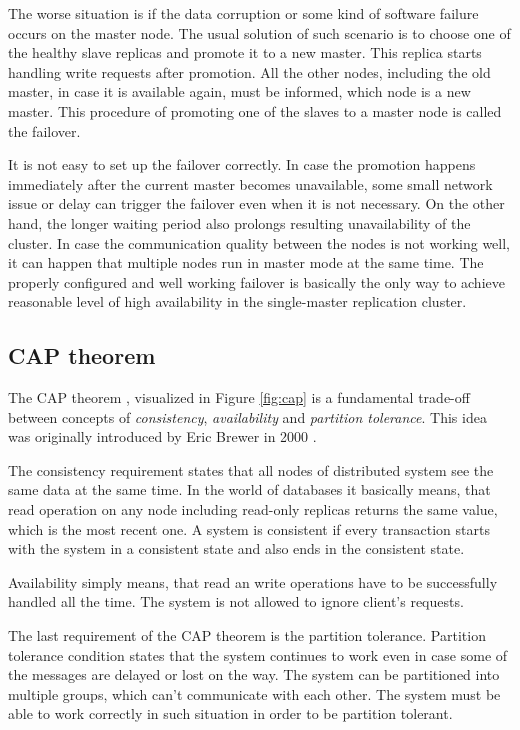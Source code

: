 \documentclass[
  digital, %
  twoside, %
  table,   %
  lof,     %
  lot,     %
]{fithesis3}
\begin{document}
The worse situation is if the data corruption or some kind of software failure occurs on the master node. The usual solution of such scenario is to choose one of the healthy slave replicas and promote it to a new master. This replica starts handling write requests after promotion. All the other nodes, including the old master, in case it is available again, must be informed, which node is a new master. This procedure of promoting one of the slaves to a master node is called the failover.

It is not easy to set up the failover correctly. In case the promotion happens immediately after the current master becomes unavailable, some small network issue or delay can trigger the failover even when it is not necessary. On the other hand, the longer waiting period also prolongs resulting unavailability of the cluster. In case the communication quality between the nodes is not working well, it can happen that multiple nodes run in master mode at the same time. The properly configured and well working failover is basically the only way to achieve reasonable level of high availability in the single-master replication cluster.

\subsection{CAP theorem}
The CAP theorem \cite{cap}, visualized in Figure \ref{fig:cap} is a fundamental trade-off between concepts of \textit{consistency}, \textit{availability} and \textit{partition tolerance}. This idea was originally introduced by Eric Brewer in 2000 \cite{brewer_cap}.

The consistency requirement states that all nodes of distributed system see the same data at the same time. In the world of databases it basically means, that read operation on any node including read-only replicas returns the same value, which is the most recent one. A system is consistent if every transaction starts with the system in a consistent state and also ends in the consistent state.

Availability simply means, that read an write operations have to be successfully handled all the time. The system is not allowed to ignore client's requests.

The last requirement of the CAP theorem is the partition tolerance. Partition tolerance condition states that the system continues to work even in case some of the messages are delayed or lost on the way. The system can be partitioned into multiple groups, which can't communicate with each other. The system must be able to work correctly in such situation in order to be partition tolerant.
\end{document}
